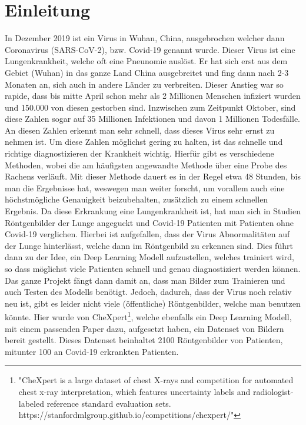 \chapter{Einleitung}
\label{ch:einleitung}

In Dezember 2019 ist ein Virus in Wuhan, China, ausgebrochen welcher dann Coronavirus (SARS-CoV-2), bzw. Covid-19 genannt wurde. Dieser Virus ist eine Lungenkrankheit, welche oft eine Pneunomie auslöst. Er hat sich erst aus dem Gebiet (Wuhan) in das ganze Land China ausgebreitet und fing dann nach 2-3 Monaten an, sich auch in andere Länder zu verbreiten. Dieser Anstieg war so rapide, dass bis mitte April schon mehr als 2 Millionen Menschen infiziert wurden und 150.000 von diesen gestorben sind. Inzwischen zum Zeitpunkt Oktober, sind diese Zahlen sogar auf 35 Millionen Infektionen und davon 1 Millionen Todesfälle. An diesen Zahlen erkennt man sehr schnell, dass dieses Virus sehr ernst zu nehmen ist. Um diese Zahlen möglichst gering zu halten, ist das schnelle und richtige diagnostizieren der Krankheit wichtig. Hierfür gibt es verschiedene Methoden, wobei die am häufigsten angewandte Methode über eine Probe des Rachens verläuft. Mit dieser Methode dauert es in der Regel etwa 48 Stunden, bis man die Ergebnisse hat, weswegen man weiter forscht, um vorallem auch eine höchstmögliche Genauigkeit beizubehalten, zusätzlich zu einem schnellen Ergebnis. Da diese Erkrankung eine Lungenkrankheit ist, hat man sich in Studien Röntgenbilder der Lunge angeguckt und Covid-19 Patienten mit Patienten ohne Covid-19 verglichen. Hierbei ist aufgefallen, dass der Virus Abnormalitäten auf der Lunge hinterlässt, welche dann im Röntgenbild zu erkennen sind. Dies führt dann zu der Idee, ein Deep Learning Modell aufzustellen, welches trainiert wird, so dass möglichst viele Patienten schnell und genau diagnostiziert werden können.
\newline
Das ganze Projekt fängt dann damit an, dass man Bilder zum Trainieren und auch Testen des Modells benötigt. Jedoch, dadurch, dass der Virus noch relativ neu ist, gibt es leider nicht viele (öffentliche) Röntgenbilder, welche man benutzen könnte. Hier wurde von CheXpert\footnote{"CheXpert is a large dataset of chest X-rays and competition for automated chest x-ray interpretation, which features uncertainty labels and radiologist-labeled reference standard evaluation sets. https://stanfordmlgroup.github.io/competitions/chexpert/"}, welche ebenfalls ein Deep Learning Modell, mit einem passenden Paper dazu, aufgesetzt haben, ein Datenset von Bildern bereit gestellt. Dieses Datenset beinhaltet 2100 Röntgenbilder von Patienten, mitunter 100 an Covid-19 erkrankten Patienten.
